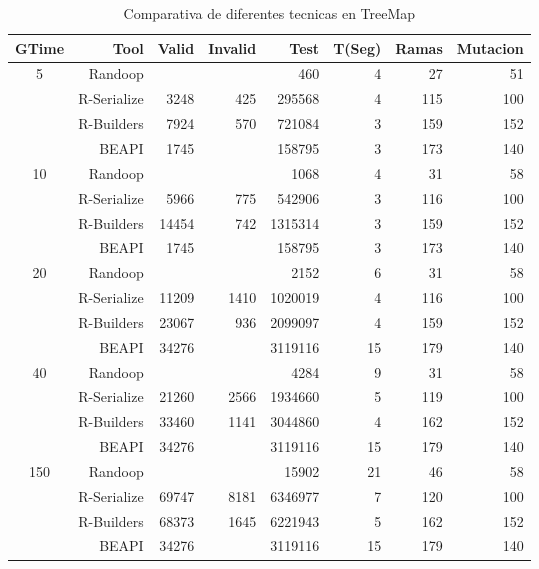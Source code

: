 \begin{table}[H]
\scriptsize
\centering
\begin{tabular}{ c  r  |r | r | r|r|r|r  }
  \toprule
  \textbf{GTime} & \textbf{Tool} & \textbf{Valid}  & \textbf{Invalid} & \textbf{Test}&\textbf{T(Seg)} &\textbf{Ramas}  & \textbf{Mutacion} \\ 
  \midrule
5	&	Randoop	&		&		&	460	&	4	&	27	&	51	\\
	&	R-Serialize	&	3248	&	425	&	295568	&	4	&	115	&	100	\\
	&	R-Builders	&	7924	&	570	&	721084	&	3	&	159	&	152	\\
	&	BEAPI	&	1745	&		&	158795	&	3	&	173	&	140	\\
 \cline{2-8}															
10	&	Randoop	&		&		&	1068	&	4	&	31	&	58	\\
	&	R-Serialize	&	5966	&	775	&	542906	&	3	&	116	&	100	\\
	&	R-Builders	&	14454	&	742	&	1315314	&	3	&	159	&	152	\\
	&	BEAPI	&	1745	&		&	158795	&	3	&	173	&	140	\\
 \cline{2-8}															
20	&	Randoop	&		&		&	2152	&	6	&	31	&	58	\\
	&	R-Serialize	&	11209	&	1410	&	1020019	&	4	&	116	&	100	\\
	&	R-Builders	&	23067	&	936	&	2099097	&	4	&	159	&	152	\\
	&	BEAPI	&	34276	&		&	3119116	&	15	&	179	&	140	\\
 \cline{2-8}															
40	&	Randoop	&		&		&	4284	&	9	&	31	&	58	\\
	&	R-Serialize	&	21260	&	2566	&	1934660	&	5	&	119	&	100	\\
	&	R-Builders	&	33460	&	1141	&	3044860	&	4	&	162	&	152	\\
	&	BEAPI	&	34276	&		&	3119116	&	15	&	179	&	140	\\
 \cline{2-8}															
150	&	Randoop	&		&		&	15902	&	21	&	46	&	58	\\
	&	R-Serialize	&	69747	&	8181	&	6346977	&	7	&	120	&	100	\\
	&	R-Builders	&	68373	&	1645	&	6221943	&	5	&	162	&	152	\\
	&	BEAPI	&34276&		&	3119116	&	15	&	179	&	140	\\
\midrule
\end{tabular}
\caption{Comparativa de diferentes tecnicas en TreeMap}
\label{tab:treeMapTools}
\end{table}

